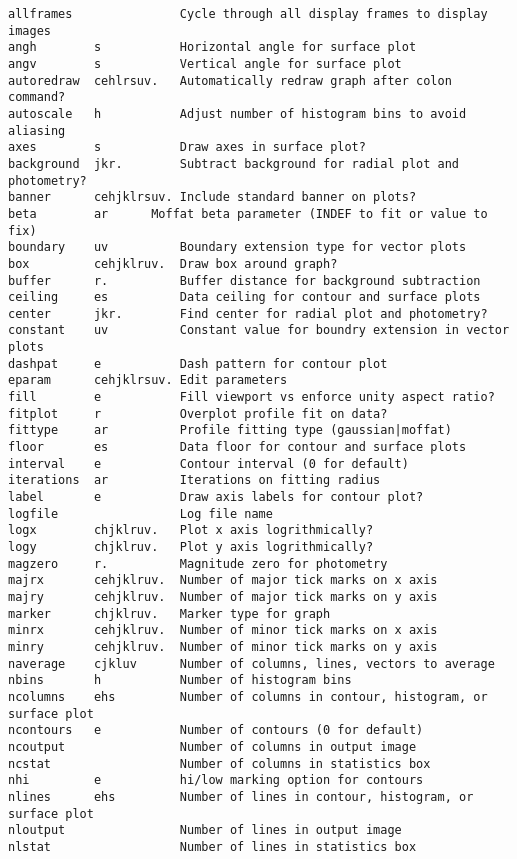 \begin{verbatim}
allframes               Cycle through all display frames to display images
angh        s           Horizontal angle for surface plot
angv        s           Vertical angle for surface plot
autoredraw  cehlrsuv.   Automatically redraw graph after colon command?
autoscale   h           Adjust number of histogram bins to avoid aliasing
axes        s           Draw axes in surface plot?
background  jkr.        Subtract background for radial plot and photometry?
banner      cehjklrsuv. Include standard banner on plots?
beta        ar		Moffat beta parameter (INDEF to fit or value to fix)
boundary    uv          Boundary extension type for vector plots
box         cehjklruv.  Draw box around graph?
buffer      r.          Buffer distance for background subtraction
ceiling     es          Data ceiling for contour and surface plots
center      jkr.        Find center for radial plot and photometry?
constant    uv          Constant value for boundry extension in vector plots
dashpat     e           Dash pattern for contour plot
eparam      cehjklrsuv. Edit parameters
fill        e           Fill viewport vs enforce unity aspect ratio?
fitplot     r           Overplot profile fit on data?
fittype     ar          Profile fitting type (gaussian|moffat)
floor       es          Data floor for contour and surface plots
interval    e           Contour interval (0 for default)
iterations  ar          Iterations on fitting radius
label       e           Draw axis labels for contour plot?
logfile                 Log file name
logx        chjklruv.   Plot x axis logrithmically?
logy        chjklruv.   Plot y axis logrithmically?
magzero     r.          Magnitude zero for photometry
majrx       cehjklruv.  Number of major tick marks on x axis
majry       cehjklruv.  Number of major tick marks on y axis
marker      chjklruv.   Marker type for graph
minrx       cehjklruv.  Number of minor tick marks on x axis
minry       cehjklruv.  Number of minor tick marks on y axis
naverage    cjkluv      Number of columns, lines, vectors to average
nbins       h           Number of histogram bins
ncolumns    ehs         Number of columns in contour, histogram, or surface plot
ncontours   e           Number of contours (0 for default)
ncoutput                Number of columns in output image
ncstat                  Number of columns in statistics box
nhi         e           hi/low marking option for contours
nlines      ehs         Number of lines in contour, histogram, or surface plot
nloutput                Number of lines in output image
nlstat                  Number of lines in statistics box

\end{verbatim}
